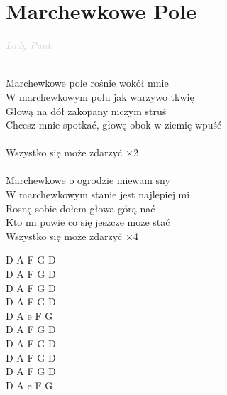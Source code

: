 \documentclass[a5paper, 10pt]{book}
\begin{document}
\section{Marchewkowe Pole}\textcolor{lightgray}{\textit{Lady Pank}}\\~\\
\begin{minipage}[t]{0.7\textwidth}
  Marchewkowe pole rośnie wokół mnie \\
  W marchewkowym polu jak warzywo tkwię \\
  Głową na dół zakopany niczym struś \\
  Chcesz mnie spotkać, głowę obok w ziemię wpuść \\
  \\
  \hspace*{5mm}Wszystko się może zdarzyć \hspace*{10mm} $\times$2\\
  \\
  Marchewkowe o ogrodzie miewam sny \\
  W marchewkowym stanie jest najlepiej mi \\
  Rosnę sobie dołem głowa górą nać \\
  Kto mi powie co się jeszcze może stać\\

  \hspace*{5mm}Wszystko się może zdarzyć \hspace*{10mm} $\times$4\\
\end{minipage}
\begin{minipage}[t]{0.3\textwidth}
  D A F G D\\
  D A F G D\\
  D A F G D\\
  D A F G D\\

  D A e F G\\

  D A F G D\\
  D A F G D\\
  D A F G D\\
  D A F G D\\

  D A e F G\\
\end{minipage}

\newpage
\end{document}
